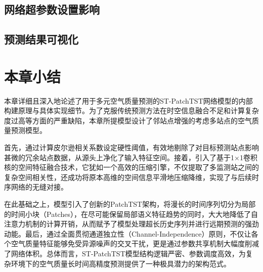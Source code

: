 \subsection{网络超参数设置影响}

\subsection{预测结果可视化}

\section{本章小结}

本章详细且深入地论述了用于多元空气质量预测的ST-PatchTST网络模型的内部构建原理与具体实现细节。为了克服传统预测方法在时空信息融合不足和计算复杂度过高等方面的严重缺陷，本章所提模型设计了邻站点增强的考虑多站点的空气质量预测模型。

首先，通过计算皮尔逊相关系数设定硬性阈值，有效地剔除了对目标预测站点影响甚微的冗余站点数据，从源头上净化了输入特征空间。接着，引入了基于1×1卷积核的空间特征融合技术，它犹如一个高效的压缩引擎，不仅提取了多监测站之间的复杂空间相关性，还成功将原本高维的空间信息平滑地压缩降维，实现了与后续时序网络的无缝对接。

在此基础之上，模型引入了创新的PatchTST架构，将漫长的时间序列切分为局部的时间小块（Patches），在尽可能保留局部语义特征趋势的同时，大大地降低了自注意力机制的计算开销，从而赋予了模型处理超长历史序列并进行远期预测的强劲动能。最后，通过全面贯彻通道独立性（Channel-Independence）原则，不仅让各个空气质量特征能够免受异源噪声的交叉干扰，更是通过参数共享机制大幅度削减了网络体积。总体而言，ST-PatchTST模型结构逻辑严密、参数调度高效，为复杂环境下的空气质量长时间高精度预测提供了一种极具潜力的架构范式。
